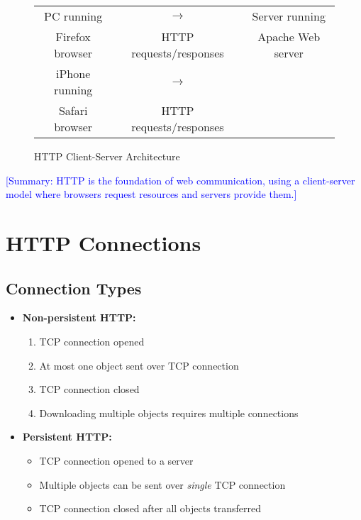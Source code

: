 \documentclass[12pt]{article}
\begin{document}
\begin{figure}[h]
    \centering
    \begin{tabular}{c c c}
        PC running      & $\rightarrow$           & Server running    \\
        Firefox browser & HTTP requests/responses & Apache Web server \\
        iPhone running  & $\rightarrow$           &                   \\
        Safari browser  & HTTP requests/responses &                   \\
    \end{tabular}
    \caption{HTTP Client-Server Architecture}
\end{figure}

\textcolor{blue}{[Summary: HTTP is the foundation of web communication, using a client-server model where browsers request resources and servers provide them.]}

\section{HTTP Connections}

\subsection{Connection Types}
\begin{itemize}
    \item \textbf{Non-persistent HTTP:}
          \begin{enumerate}
              \item TCP connection opened
              \item At most one object sent over TCP connection
              \item TCP connection closed
              \item Downloading multiple objects requires multiple connections
          \end{enumerate}

    \item \textbf{Persistent HTTP:}
          \begin{itemize}
              \item TCP connection opened to a server
              \item Multiple objects can be sent over \textit{single} TCP connection
              \item TCP connection closed after all objects transferred
          \end{itemize}
\end{itemize}
\end{document}
